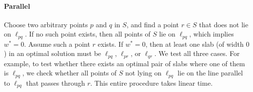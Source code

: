 \documentclass[10pt,a4paper]{article}
\theoremstyle{star}
\theoremstyle{claimstar}
\begin{document}
\paragraph*{Parallel}
Choose two arbitrary points $p$ and $q$ in $S$, and find a point $r \in S$ that does not lie on $\ell_{pq}$. 
If no such point exists, then all points of $S$ lie on $\ell_{pq}$, which implies $w^* = 0$.
Assume such a point $r$ exists. 
If $w^* = 0$, then at least one slab (of width $0$) in an optimal solution must be $\ell_{pq}$, $\ell_{pr}$, or $\ell_{qr}$.
We test all three cases. 
For example, to test whether there exists an optimal pair of slabs where one of them is $\ell_{pq}$, we check whether all points of $S$ not lying on $\ell_{pq}$ lie on the line parallel to $\ell_{pq}$ that passes through $r$. 
This entire procedure takes linear time.
\end{document}
